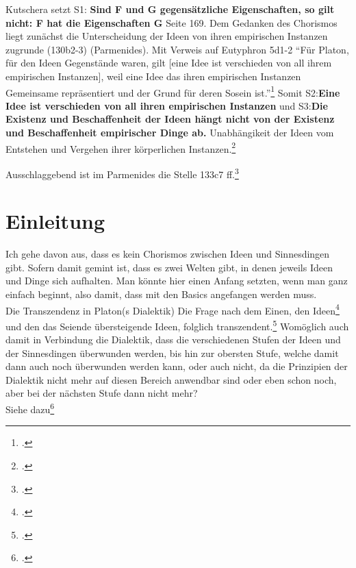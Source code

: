 \documentclass[12pt]{article}
\begin{document}
Kutschera setzt S1: \textbf{Sind F und G gegensätzliche Eigenschaften, so gilt nicht: F hat die Eigenschaften G}
Seite 169. Dem Gedanken des Chorismos liegt zunächst die Unterscheidung der Ideen von ihren empirischen Instanzen zugrunde (130b2-3) (Parmenides). Mit Verweis auf Eutyphron 5d1-2 
\enquote{Für Platon, für den Ideen Gegenstände waren, gilt [eine Idee ist verschieden von all ihrem empirischen Instanzen], weil eine Idee das ihren empirischen Instanzen Gemeinsame repräsentiert und der Grund für deren Sosein ist.}\footcite[vgl.][S. 169]{Kutschera} Somit S2:\textbf{Eine Idee ist verschieden von all ihren empirischen Instanzen} und S3:\textbf{Die Existenz und Beschaffenheit der Ideen hängt nicht von der Existenz und Beschaffenheit empirischer Dinge ab.} Unabhängikeit der Ideen vom Entstehen und Vergehen ihrer körperlichen Instanzen.\footcite[vgl.][S. 167]{Kutschera}

Ausschlaggebend ist im Parmenides die Stelle 133c7 ff.\footcite[vgl.][S. 179]{Kutschera}
 



\section{Einleitung}
Ich gehe davon aus, dass es kein Chorismos zwischen Ideen und Sinnesdingen gibt. Sofern damit gemint ist, dass es zwei Welten gibt, in denen jeweils Ideen und Dinge sich aufhalten. 
Man könnte hier einen Anfang setzten, wenn man ganz einfach beginnt, also damit, dass mit den Basics angefangen werden muss.\\
Die Transzendenz in Platon(s Dialektik) 
Die Frage nach dem Einen, den Ideen\footcite[][]{Staudacher} und den das Seiende übersteigende Ideen, folglich transzendent.\footcite[][]{Bordt}
Womöglich auch damit in Verbindung die Dialektik, dass die verschiedenen Stufen der Ideen und der Sinnesdingen überwunden werden, bis hin zur obersten Stufe, welche damit dann auch noch überwunden werden kann, oder auch nicht, da die Prinzipien der Dialektik nicht mehr auf diesen Bereich anwendbar sind oder eben schon noch, aber bei der nächsten Stufe dann nicht mehr?\\
Siehe dazu\footcite[vgl.][S. 104ff]{Hirschberger}
\end{document}

